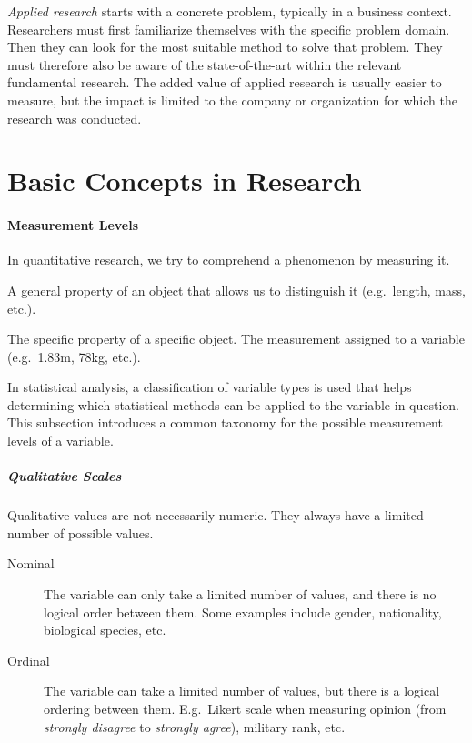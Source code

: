\emph{Applied research} starts with a concrete problem, typically in a business context. Researchers must first familiarize themselves with the specific problem domain. Then they can look for the most suitable method to solve that problem. They must therefore also be aware of the state-of-the-art within the relevant fundamental research. The added value of applied research is usually easier to measure, but the impact is limited to the company or organization for which the research was conducted.

\section{Basic Concepts in Research}
\label{sec:research-process-basic-concepts}

\paragraph{Measurement Levels}

In quantitative research, we try to comprehend a phenomenon by measuring it.

\begin{definition}[Variable]
     A general property of an object that allows us to distinguish it (e.g.~length, mass, etc.).
\end{definition}

\begin{definition}[Value]
    The specific property of a specific object. The measurement assigned to a variable (e.g.~1.83m, 78kg, etc.).
\end{definition}

In statistical analysis, a classification of variable types is used that helps determining which statistical methods can be applied to the variable in question. 
This subsection introduces a common taxonomy for the possible measurement levels of a variable.

\subparagraph{Qualitative Scales}

Qualitative values are not necessarily numeric.
They always have a limited number of possible values.

\begin{description}
    \item [Nominal] The variable can only take a limited number of values, and there is no logical order between them. Some examples include gender, nationality, biological species, etc.
    \item [Ordinal] The variable can take a limited number of values, but there is a logical ordering between them. E.g.~Likert scale when measuring opinion (from \emph{strongly disagree} to \emph{strongly agree}), military rank, etc.	
\end{description}


